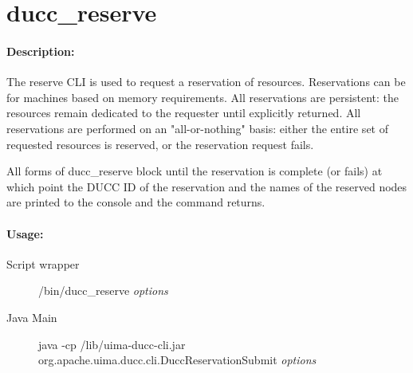 % 
% 
% 
% 
\ifpdf
\else
{}
\fi
    \section{ducc\_reserve}

    \paragraph{Description:}
    The reserve CLI is used to request a reservation of resources. Reservations can be for machines 
    based on memory requirements. All reservations are persistent: 
    the resources remain dedicated to the requester until explicitly returned. All reservations are 
    performed on an "all-or-nothing" basis: either the entire set of requested resources is reserved, 
    or the reservation request fails. 

    All forms of ducc\_reserve block until the reservation is complete (or fails) at which point the DUCC
    ID of the reservation and the names of the reserved nodes are printed to the console and the
    command returns.

    \paragraph{Usage:}
        \begin{description}
        \item[Script wrapper] \ducchome/bin/ducc\_reserve {\em options}
        \item[Java Main]      java -cp \ducchome/lib/uima-ducc-cli.jar org.apache.uima.ducc.cli.DuccReservationSubmit {\em options}
        \end{description}


